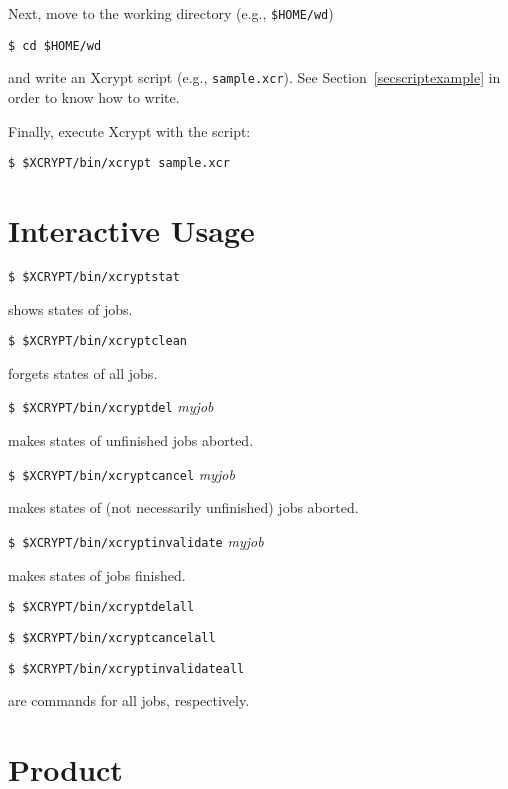 \documentclass[a4paper,10pt]{report}
\begin{document}
Next, move to the working directory (e.g., \texttt{\$HOME/wd})
\begin{screen}
\texttt{\$ cd \$HOME/wd}
\end{screen}
and write an Xcrypt script (e.g., \texttt{sample.xcr}).  See
Section~\ref{secscriptexample} in order to know how to write.

Finally, execute Xcrypt with the script:
\begin{screen}
\texttt{\$ \$XCRYPT/bin/xcrypt sample.xcr}
\end{screen}

\section{Interactive Usage}

\begin{screen}
\texttt{\$ \$XCRYPT/bin/xcryptstat}
\end{screen}
shows states of jobs.

\begin{screen}
\texttt{\$ \$XCRYPT/bin/xcryptclean}
\end{screen}
forgets states of all jobs.

\begin{screen}
\texttt{\$ \$XCRYPT/bin/xcryptdel} \textit{myjob}
\end{screen}
makes states of unfinished jobs aborted.

\begin{screen}
\texttt{\$ \$XCRYPT/bin/xcryptcancel} \textit{myjob}
\end{screen}
makes states of (not necessarily unfinished) jobs aborted.

\begin{screen}
\texttt{\$ \$XCRYPT/bin/xcryptinvalidate} \textit{myjob}
\end{screen}
makes states of jobs finished.

\begin{screen}
\texttt{\$ \$XCRYPT/bin/xcryptdelall}
\end{screen}
\begin{screen}
\texttt{\$ \$XCRYPT/bin/xcryptcancelall}
\end{screen}
\begin{screen}
\texttt{\$ \$XCRYPT/bin/xcryptinvalidateall}
\end{screen}
are commands for all jobs, respectively.

\section{Product}\label{sec:created}
\end{document}
